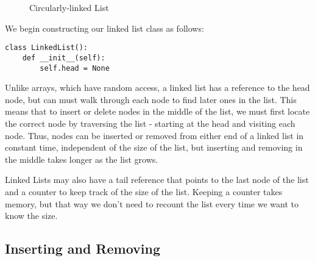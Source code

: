 \begin{figure}[!h]
\centering
{}
\caption{Circularly-linked List}
\label{Circularly-linked List}
\end{figure}

 We begin constructing our linked list class as follows:
\begin{lstlisting}
class LinkedList():
    def __init__(self):
        self.head = None
\end{lstlisting}

Unlike arrays, which have random access, a linked list has a reference to the head node, but can must walk through each node to find later ones in the list.
This means that to insert or delete nodes in the middle of the list, we must first locate the correct node by traversing the list - starting at the head and visiting each node.
Thus, nodes can be inserted or removed from either end of a linked list in constant time, independent of the size of the list, but inserting and removing in the middle takes longer as the list grows. 

Linked Lists may also have a tail reference that points to the last node of the list and a counter to keep track of the size of the list.
Keeping a counter takes memory, but that way we don't need to recount the list every time we want to know the size.


\subsection*{Inserting and Removing}

